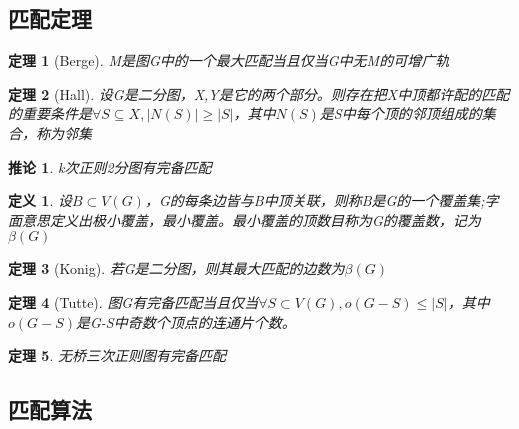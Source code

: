\documentclass[UTF8]{ctexart}
\newtheorem{dfnt}{定义}
\newtheorem{thr}{定理}
\newtheorem*{coro}{推论}
\begin{document}
\subsection{匹配定理}
\begin{thr}[Berge]
M是图G中的一个最大匹配当且仅当G中无M的可增广轨
\end{thr}
\begin{thr}[Hall]
设G是二分图，X,Y是它的两个部分。则存在把X中顶都许配的匹配的重要条件是$\forall S \subseteq X,|N(S)|\geq |S|$，其中$N(S)$是S中每个顶的邻顶组成的集合，称为邻集
\end{thr}
\begin{coro}
k次正则2分图有完备匹配
\end{coro}
\begin{dfnt}
设$B \subset V(G)$，G的每条边皆与B中顶关联，则称B是G的一个覆盖集;字面意思定义出极小覆盖，最小覆盖。最小覆盖的顶数目称为G的覆盖数，记为$\beta (G)$
\end{dfnt}
\begin{thr}[Konig]
若G是二分图，则其最大匹配的边数为$\beta (G)$
\end{thr}
\begin{thr}[Tutte]
图G有完备匹配当且仅当$\forall S \subset V(G),o(G-S) \leq |S|$，其中$o(G-S)$是G-S中奇数个顶点的连通片个数。
\end{thr}
\begin{thr}
无桥三次正则图有完备匹配
\end{thr}
\subsection{匹配算法}
\end{document}
